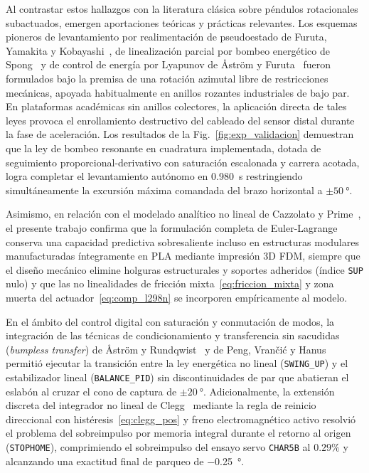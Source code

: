 Al contrastar estos hallazgos con la literatura clásica sobre péndulos rotacionales subactuados, emergen aportaciones teóricas y prácticas relevantes. Los esquemas pioneros de levantamiento por realimentación de pseudoestado de Furuta, Yamakita y Kobayashi~\cite{furuta1991}, de linealización parcial por bombeo energético de Spong~\cite{spong1995} y de control de energía por Lyapunov de {\AA}str{\"o}m y Furuta~\cite{astrom2000} fueron formulados bajo la premisa de una rotación azimutal libre de restricciones mecánicas, apoyada habitualmente en anillos rozantes industriales de bajo par. En plataformas académicas sin anillos colectores, la aplicación directa de tales leyes provoca el enrollamiento destructivo del cableado del sensor distal durante la fase de aceleración. Los resultados de la Fig.~\ref{fig:exp_validacion} demuestran que la ley de bombeo resonante en cuadratura implementada, dotada de seguimiento proporcional-derivativo con saturación escalonada y carrera acotada, logra completar el levantamiento autónomo en \qty{0.980}{\second} restringiendo simultáneamente la excursión máxima comandada del brazo horizontal a $\pm\qty{50}{\degree}$.

Asimismo, en relación con el modelado analítico no lineal de Cazzolato y Prime~\cite{cazzolato2011}, el presente trabajo confirma que la formulación completa de Euler-Lagrange conserva una capacidad predictiva sobresaliente incluso en estructuras modulares manufacturadas íntegramente en PLA mediante impresión 3D FDM, siempre que el diseño mecánico elimine holguras estructurales y soportes adheridos (índice \texttt{SUP} nulo) y que las no linealidades de fricción mixta~\eqref{eq:friccion_mixta} y zona muerta del actuador~\eqref{eq:comp_l298n} se incorporen empíricamente al modelo.

En el ámbito del control digital con saturación y conmutación de modos, la integración de las técnicas de condicionamiento y transferencia sin sacudidas (\textit{bumpless transfer}) de {\AA}str{\"o}m y Rundqwist~\cite{AstromAntiwindup1989} y de Peng, Vran{\v{c}}i{\'c} y Hanus~\cite{Peng1996} permitió ejecutar la transición entre la ley energética no lineal (\texttt{SWING\_UP}) y el estabilizador lineal (\texttt{BALANCE\_PID}) sin discontinuidades de par que abatieran el eslabón al cruzar el cono de captura de $\pm\qty{20}{\degree}$. Adicionalmente, la extensión discreta del integrador no lineal de Clegg~\cite{clegg1958} mediante la regla de reinicio direccional con histéresis~\eqref{eq:clegg_pos} y freno electromagnético activo resolvió el problema del sobreimpulso por memoria integral durante el retorno al origen (\texttt{STOPHOME}), comprimiendo el sobreimpulso del ensayo servo \texttt{CHAR5B} al $0.29\%$ y alcanzando una exactitud final de parqueo de \qty{-0.25}{\degree}.

